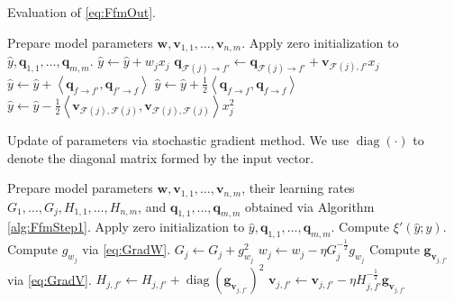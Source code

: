 \documentclass[11pt]{article}
\newcommand{\bsym}[1]{\ensuremath{\boldsymbol{#1}}}
\newcommand{\bw}{\ensuremath{\bsym{w}}}
\newcommand{\bg}{\ensuremath{\bsym{g}}}
\newcommand{\bv}{\ensuremath{\bsym{v}}}
\newcommand{\bq}{\ensuremath{\bsym{q}}}
\newcommand{\field}{\ensuremath{\mathcal F}}
\newcommand{\dotprod}[2]{\ensuremath{\left\langle #1,#2 \right\rangle}}
\DeclareMathOperator*{\diag}{diag}
\begin{document}
\begin{algorithm}
    \label{alg:FfmStep1}
    \caption{Evaluation of \eqref{eq:FfmOut}.}
    \begin{algorithmic}[1]
        \State Prepare model parameters $\bw,\bv_{1,1},\dots,\bv_{n,m}$.
        \State Apply zero initialization to $\hat{y},\bq_{1,1},\dots,\bq_{m,m}$.
            \EndIf
            \State $\hat{y} \gets \hat{y} + w_jx_j$ 
                \State $\bq_{\field(j)\rightarrow f'} \gets \bq_{\field(j)\rightarrow f'} + \bv_{\field(j), f'} x_j$
            \EndFor
        \EndFor
                \State $\hat{y}\gets \hat{y} + \dotprod{\bq_{f\rightarrow f'}}{\bq_{f'\rightarrow f}}$ 
            \EndFor
        \EndFor
            \State $\hat{y} \gets \hat{y} + \frac{1}{2}\dotprod{\bq_{f\rightarrow f}}{\bq_{f\rightarrow f}}$ 
        \EndFor
            \EndIf
            \State $\hat{y} \gets \hat{y} - \frac{1}{2} \dotprod{\bv_{\field(j),\field(j)}}{\bv_{\field(j),\field(j)}}x_j^2$ 
        \EndFor
    \end{algorithmic}
\end{algorithm}
\begin{algorithm}
    \label{alg:FfmStep2}
    \caption{Update of parameters via stochastic gradient method. We use $\diag(\cdot)$ to denote the diagonal matrix formed by the input vector.}
    \begin{algorithmic}[1]
        \State Prepare model parameters $\bw,\bv_{1,1},\dots,\bv_{n,m}$, their learning rates $G_1,\dots,G_j,H_{1,1},\dots,H_{n,m}$, and $\bq_{1,1},\dots,\bq_{m,m}$ obtained via Algorithm \ref{alg:FfmStep1}.
        \State Apply zero initialization to $\hat{y},\bq_{1,1},\dots,\bq_{m,m}$.
        \State Compute $\xi'(\hat{y};y)$.
            \EndIf
            \State Compute $g_{w_j}$ via \eqref{eq:GradW}.
            \State $G_j \gets G_j + g_{w_j}^2$ 
            \State $w_j \gets w_j - \eta G_j^{-\frac{1}{2}} g_{w_j}$ 
        \EndFor
            \EndIf
                \State Compute $\bg_{\bv_{j,f'}}$ via \eqref{eq:GradV}.
                \State $H_{j,f'}  \gets H_{j,f'} + \diag(\bg_{\bv_{j,f'}})^2$ 
                \State $\bv_{j,f'} \gets \bv_{j,f'} - \eta H_{j,f'}^{-\frac{1}{2}} \bg_{\bv_{j,f'}}$ 
            \EndFor
        \EndFor
    \end{algorithmic}
\end{algorithm}
\end{document}
